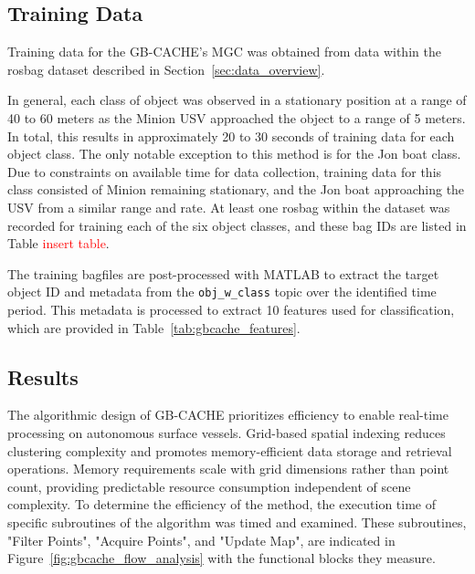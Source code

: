 

\subsection{Training Data} \label{training_data_gbcache}

Training data for the GB-CACHE's MGC was obtained from data within the rosbag dataset described in Section~\ref{sec:data_overview}.

In general, each class of object was observed in a stationary position at a range of 40 to 60 meters as the Minion \ac{USV} approached the object to a range of 5 meters. 
In total, this results in approximately 20 to 30 seconds of training data for each object class.
The only notable exception to this method is for the Jon boat class. 
Due to constraints on available time for data collection, training data for this class consisted of Minion remaining stationary, and the Jon boat approaching the \ac{USV} from a similar range and rate.
At least one rosbag within the dataset was recorded for training each of the six object classes, and these bag IDs are listed in Table \textcolor{red}{insert table}.

The training bagfiles are post-processed with MATLAB to extract the target object ID and metadata from the \texttt{obj\_w\_class} topic over the identified time period.
This metadata is processed to extract 10 features used for classification, which are provided in Table~\ref{tab:gbcache_features}.




\subsection{Results} \label{sec:gbcache_results}

The algorithmic design of \ac{GB-CACHE} prioritizes efficiency to enable real-time processing on autonomous surface vessels.
Grid-based spatial indexing reduces clustering complexity and promotes memory-efficient data storage and retrieval operations.
Memory requirements scale with grid dimensions rather than point count, providing predictable resource consumption independent of scene complexity.
To determine the efficiency of the method, the execution time of specific subroutines of the algorithm was timed and examined.
These subroutines, "Filter Points", "Acquire Points", and "Update Map", are indicated in Figure~\ref{fig:gbcache_flow_analysis} with the functional blocks they measure.

